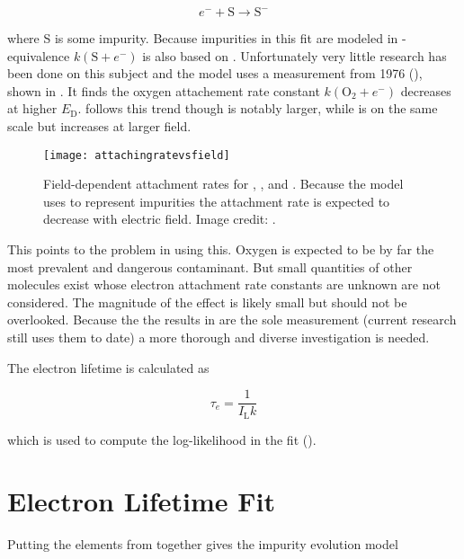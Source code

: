 \begin{equation}
e^- + \mathrm{S} \rightarrow \mathrm{S^-}
\end{equation}

\noindent where S is some impurity.  Because impurities in this fit are modeled in -equivalence
$k(\mathrm{S} + e^-)$ is also based on .  Unfortunately very little research has been done on this subject and the model uses a
measurement from
1976 (), shown in .  It finds the oxygen attachement rate
constant $k(\mathrm{O_2} + e^-)$ decreases at higher $E_{\mathrm{D}}$.   follows this trend though is notably larger, while
 is on the same scale but increases at larger field.

\begin{figure}
\centering
\texttt{[image: attachingratevsfield]}
\caption{Field-dependent attachment rates for , , and .  Because the model uses  to represent
impurities the attachment rate is expected to decrease with electric field.  Image credit: .}
\label{fig:electron_lifetime_model_field_attaching_rate}
\end{figure}

This points to the problem in using this.  Oxygen is expected to be by far the most prevalent and dangerous contaminant.  But small
quantities of other molecules exist whose electron attachment rate constants are unknown are not considered.  The magnitude of the effect
is likely small but should not be overlooked.  Because the the results in  are
the sole measurement (current research still uses them to date) a more thorough and diverse investigation is needed.

The electron lifetime is calculated as

\begin{equation}
\tau_e = \frac{1}{I_{\mathrm{L}} k}
\label{eq:electron_lifetime_model_field_lifetime}
\end{equation}

\noindent which is used to compute the log-likelihood in the fit (\secref{}).



\section{Electron Lifetime Fit}
\label{sec:elifetime_fit}
Putting the elements from  together gives the impurity evolution model

